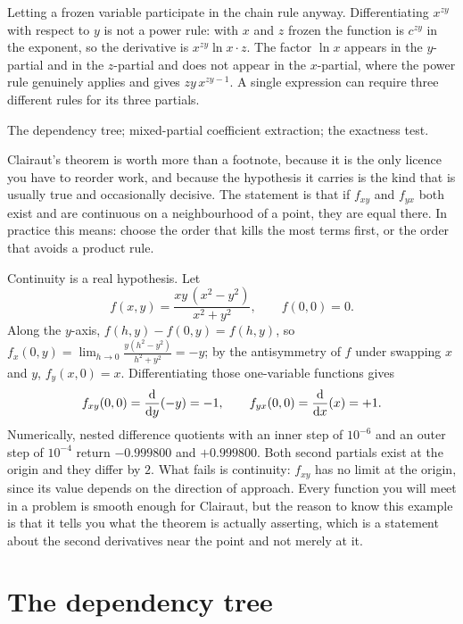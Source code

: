 \begin{trap}
Letting a frozen variable participate in the chain rule anyway. Differentiating $x^{zy}$ with respect to $y$ is not a power rule: with $x$ and $z$ frozen the function is $c^{zy}$ in the exponent, so the derivative is $x^{zy}\ln x\cdot z$. The factor $\ln x$ appears in the $y$-partial and in the $z$-partial and does not appear in the $x$-partial, where the power rule genuinely applies and gives $zy\,x^{zy-1}$. A single expression can require three different rules for its three partials.
\end{trap}

\begin{seealsob}The dependency tree; mixed-partial coefficient extraction; the exactness test.\end{seealsob}

Clairaut's theorem is worth more than a footnote, because it is the only licence you have to reorder work, and because the hypothesis it carries is the kind that is usually true and occasionally decisive. The statement is that if $f_{xy}$ and $f_{yx}$ both exist and are continuous on a neighbourhood of a point, they are equal there. In practice this means: choose the order that kills the most terms first, or the order that avoids a product rule.

\begin{keynote}
Continuity is a real hypothesis. Let
\[
f(x,y)=\frac{xy\,(x^{2}-y^{2})}{x^{2}+y^{2}},\qquad f(0,0)=0 .
\]
Along the $y$-axis, $f(h,y)-f(0,y)=f(h,y)$, so $f_{x}(0,y)=\lim_{h\to0}\tfrac{y(h^{2}-y^{2})}{h^{2}+y^{2}}=-y$; by the antisymmetry of $f$ under swapping $x$ and $y$, $f_{y}(x,0)=x$. Differentiating those one-variable functions gives
\[
f_{xy}(0,0)=\frac{\mathrm{d}}{\mathrm{d}y}(-y)=-1,\qquad f_{yx}(0,0)=\frac{\mathrm{d}}{\mathrm{d}x}(x)=+1 .
\]
Numerically, nested difference quotients with an inner step of $10^{-6}$ and an outer step of $10^{-4}$ return $-0.999800$ and $+0.999800$. Both second partials exist at the origin and they differ by $2$. What fails is continuity: $f_{xy}$ has no limit at the origin, since its value depends on the direction of approach. Every function you will meet in a problem is smooth enough for Clairaut, but the reason to know this example is that it tells you what the theorem is actually asserting, which is a statement about the second derivatives near the point and not merely at it.
\end{keynote}

\section{The dependency tree}

